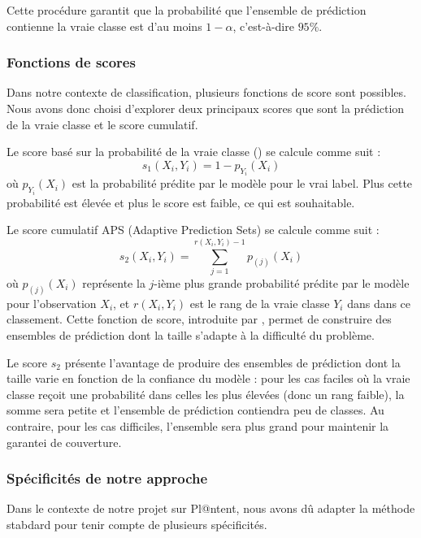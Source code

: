 \documentclass[a4paper,12pt]{article}
\begin{document}
Cette procédure garantit que la probabilité que l'ensemble de prédiction contienne la vraie classe est d'au moins $1- \alpha$, c'est-à-dire $95\%$.

\subsubsection{Fonctions de scores}

Dans notre contexte de classification, plusieurs fonctions de score sont possibles. Nous avons donc choisi d'explorer deux principaux scores que sont la prédiction de la vraie classe et le score cumulatif.

\vspace{0.2cm}

Le score basé sur la probabilité de la vraie classe (\cite{Vovk}) se calcule comme suit : 
$$ s_1(X_i, Y_i) = 1 - p_{Y_i}(X_i) $$ où $p_{Y_i}(X_i)$ est la probabilité prédite par le modèle pour le vrai label. Plus cette probabilité est élevée et plus le score est faible, ce qui est souhaitable.

\vspace{0.2cm}

Le score cumulatif APS (Adaptive Prediction Sets) se calcule comme suit : 
$$ s_2(X_i, Y_i) = \sum_{j=1}^{r(X_i, Y_i)-1} p_{(j)}(X_i) $$ où $p_{(j)}(X_i)$ représente la $j$-ième plus grande probabilité prédite par le modèle pour l'observation $X_i$, et $r(X_i, Y_i)$ est le rang de la vraie classe $Y_i$ dans dans ce classement. Cette fonction de score, introduite par \cite{Romano}, permet de construire des ensembles de prédiction dont la taille s'adapte à la difficulté du problème.

\vspace{0.2cm}

Le score $s_2$ présente l'avantage de produire des ensembles de prédiction dont la taille varie en fonction de la confiance du modèle : pour les cas faciles où la vraie classe reçoit une probabilité dans celles les plus élevées (donc un rang faible), la somme sera petite et l'ensemble de prédiction contiendra peu de classes. Au contraire, pour les cas difficiles, l'ensemble sera plus grand pour maintenir la garantei de couverture.

\subsubsection{Spécificités de notre approche}

Dans le contexte de notre projet sur Pl@ntent, nous avons dû adapter la méthode stabdard pour tenir compte de plusieurs spécificités.
\end{document}
